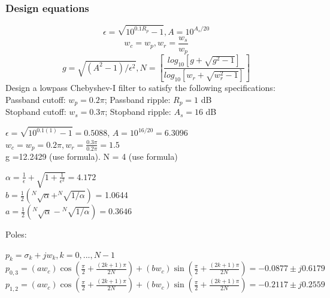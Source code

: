 \documentclass{article}
\begin{document}
\subsubsection{Design equations}
\begin{equation}
\epsilon = \sqrt{10^{0.1R_p}-1}, A=10^{A_s/20}
\end{equation}
\begin{equation}
w_c=w_p, w_r=\frac{w_s}{w_p}
\end{equation}
\begin{equation}
g = \sqrt{(A^2-1)/\epsilon^2}, N =[\frac{log_{10}[g+\sqrt{g^2-1}]}{log_{10}[w_r+\sqrt{w_r^2-1}]}]
\end{equation}
Design a lowpass Chebyshev-I filter to satisfy the following specifications: \\
\vspace{1em}
Passband cutoff: $w_p=0.2\pi$; Passband ripple: $R_p=1$ dB \\
\vspace{1em}
Stopband cutoff: $w_s=0.3\pi$; Stopband ripple: $A_s =16$ dB \\
\vspace{1em}
\begin{center}
$\epsilon = \sqrt{10^{0.1(1)}-1}=0.5088$, $A=10^{16/20}=6.3096$ \\
\vspace{1em}
$w_c=w_p=0.2\pi, w_r=\frac{0.3\pi}{0.2\pi}=1.5$\\
\vspace{1em}
g =12.2429 (use formula). N = 4 (use formula)
\end{center}
\begin{center}
$\alpha=\frac{1}{\epsilon}+\sqrt{1+\frac{1}{\epsilon^2}} = 4.172$ \\
\vspace{1em}
$b =\frac{1}{2}(^N\sqrt{\alpha}+^N\sqrt{1/\alpha})$ = 1.0644 \\
\vspace{1em}
$a = \frac{1}{2}(^N\sqrt{\alpha}-{^N\sqrt{1/\alpha}}) = 0.3646$ 
\end{center}
Poles:
\begin{center}
$p_k = \sigma_k+jw_k, k = 0,...,N-1 $ \\
\vspace{1em}
$p_{0,3}=  (a w_c)\cos(\frac{\pi}{2}+\frac{(2k+1)\pi}{2N}) +  (bw_c)\sin(\frac{\pi}{2}+\frac{(2k+1)\pi}{2N}) = -0.0877 \pm j0.6179$  \\
\vspace{1em}
$p_{1,2}=  (a w_c)\cos(\frac{\pi}{2}+\frac{(2k+1)\pi}{2N}) +  (bw_c)\sin(\frac{\pi}{2}+\frac{(2k+1)\pi}{2N}) = -0.2117 \pm j0.2559
$
\end{center}
\end{document}
